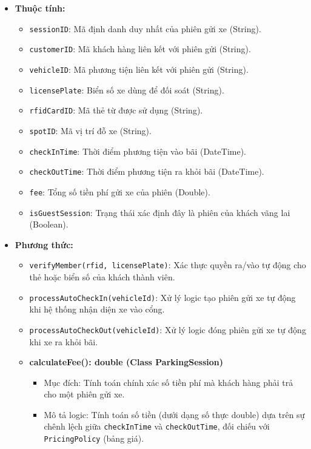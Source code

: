 \begin{itemize}
    \item \textbf{Thuộc tính:}
    \begin{itemize}
        \item \texttt{sessionID}: Mã định danh duy nhất của phiên gửi xe (String).
        \item \texttt{customerID}: Mã khách hàng liên kết với phiên gửi (String).
        \item \texttt{vehicleID}: Mã phương tiện liên kết với phiên gửi (String).
        \item \texttt{licensePlate}: Biển số xe dùng để đối soát (String).
        \item \texttt{rfidCardID}: Mã thẻ từ được sử dụng (String).
        \item \texttt{spotID}: Mã vị trí đỗ xe (String).
        \item \texttt{checkInTime}: Thời điểm phương tiện vào bãi (DateTime).
        \item \texttt{checkOutTime}: Thời điểm phương tiện ra khỏi bãi (DateTime).
        \item \texttt{fee}: Tổng số tiền phí gửi xe của phiên (Double).
        \item \texttt{isGuestSession}: Trạng thái xác định đây là phiên của khách vãng lai (Boolean).
    \end{itemize}
    \item \textbf{Phương thức:}
    \begin{itemize}
        \item \texttt{verifyMember(rfid, licensePlate)}: Xác thực quyền ra/vào tự động cho thẻ hoặc biển số của khách thành viên.
        \item \texttt{processAutoCheckIn(vehicleId)}: Xử lý logic tạo phiên gửi xe tự động khi hệ thống nhận diện xe vào cổng.
        \item \texttt{processAutoCheckOut(vehicleId)}: Xử lý logic đóng phiên gửi xe tự động khi xe ra khỏi bãi.
        \item \textbf{calculateFee(): double (Class ParkingSession)}
        \begin{itemize}
            \item Mục đích: Tính toán chính xác số tiền phí mà khách hàng phải trả cho một phiên gửi xe.
            \item Mô tả logic: Tính toán số tiền (dưới dạng số thực double) dựa trên sự chênh lệch giữa \texttt{checkInTime} và \texttt{checkOutTime}, đối chiếu với \texttt{PricingPolicy} (bảng giá).
        \end{itemize}

    \end{itemize}
\end{itemize}

